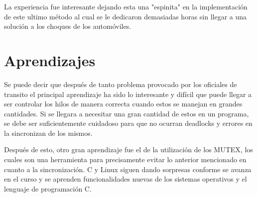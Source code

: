 \documentclass[16pt,a4papper]{article}
\begin{document}
	La experiencia fue interesante dejando esta una "espinita" en la implementación de este ultimo método al cual se le dedicaron demasiadas horas sin llegar a una solución a los choques de los automóviles.
	
	\newpage
	\section{Aprendizajes}
	
	Se puede decir que después de tanto problema provocado por los oficiales de transito el principal aprendizaje ha sido lo interesante y difícil que puede llegar a ser controlar los hilos de manera correcta cuando estos se manejan en grandes cantidades. Si se llegara a necesitar una gran cantidad de estos en un programa, se debe ser suficientemente cuidadoso para que no ocurran deadlocks y errores en la sincronizan de los mismos.\par 
	
	Después de esto, otro gran aprendizaje fue el de la utilización de los MUTEX, los cuales son una herramienta para precisamente evitar lo anterior mencionado en cuanto a la sincronización. C y Linux siguen dando sorpresas conforme se avanza en el curso y se aprenden funcionalidades nuevas de los sistemas operativos y el lenguaje de programación C.

	\newpage
	\printbibliography
	
	
\end{document}
